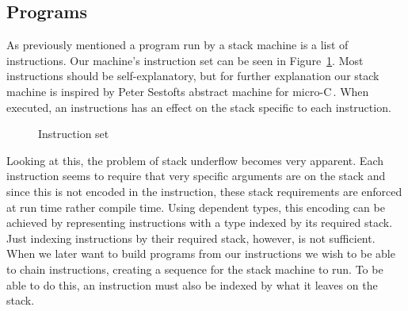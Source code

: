 \subsection{Programs}
\label{sec:program}
As previously mentioned a program run by a stack machine is a list of instructions. Our machine's instruction set can be seen in Figure~\ref{fig:inst_set}. Most instructions should be self-explanatory, but for further explanation our stack machine is inspired by Peter Sestofts abstract machine for micro-C\,\cite[pp. 157-161]{Sestoft:PLC}. When executed, an instructions has an effect on the stack specific to each instruction.

\begin{figure}
\caption{Instruction set}
\label{fig:inst_set}
\end{figure}

Looking at this, the problem of stack underflow becomes very apparent. Each instruction seems to require that very specific arguments are on the stack and since this is not encoded in the instruction, these stack requirements are enforced at run time rather compile time. Using dependent types, this encoding can be achieved by representing instructions with a type indexed by its required stack. Just indexing instructions by their required stack, however, is not sufficient. When we later want to build programs from our instructions we wish to be able to chain instructions, creating a sequence for the stack machine to run. To be able to do this, an instruction must also be indexed by what it leaves on the stack. 

